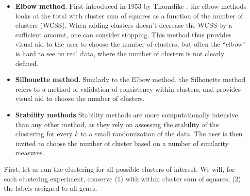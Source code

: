 \documentclass[9pt,a4paper,]{extarticle}
\newenvironment{Shaded}{\begin{snugshade}}{\end{snugshade}}
\newcommand{\ControlFlowTok}[1]{\textcolor[rgb]{0.13,0.29,0.53}{\textbf{#1}}}
\newcommand{\DataTypeTok}[1]{\textcolor[rgb]{0.13,0.29,0.53}{#1}}
\newcommand{\DecValTok}[1]{\textcolor[rgb]{0.00,0.00,0.81}{#1}}
\newcommand{\KeywordTok}[1]{\textcolor[rgb]{0.13,0.29,0.53}{\textbf{#1}}}
\newcommand{\NormalTok}[1]{#1}
\newcommand{\OperatorTok}[1]{\textcolor[rgb]{0.81,0.36,0.00}{\textbf{#1}}}
\newcommand{\StringTok}[1]{\textcolor[rgb]{0.31,0.60,0.02}{#1}}
\begin{document}
\begin{itemize}
\tightlist
\item
  \textbf{Elbow method}. First introduced in 1953 by Thorndike \citep{thorndike:who},
  the elbow methods looks at the total with cluster sum of squares
  as a function of the number of clusters (WCSS). When adding clusters
  doesn't decrease the WCSS by a sufficient
  amount, one can consider stopping. This method thus provides visual aid to
  the user to choose the number of clusters, but often the ``elbow'' is hard to
  see on real data, where the number of clusters is not clearly defined.
\item
  \textbf{Silhouette method}. Similarly to the Elbow method, the Silhouette method
  refers to a method of validation of consistency within clusters, and
  provides visual aid to choose the number of clusters.
\item
  \textbf{Stability methods} Stability methods are more computationally intensive
  than any other method, as they rely on assessing the stability of the
  clustering for every \(k\) to a small randomization of the data. The user is
  then invited to choose the number of cluster based on a number of similarity
  measures.
\end{itemize}

First, let us run the clustering for all possible clusters of interest. We
will, for each clustering experiment, conserve (1) with within cluster sum of
squares; (2) the labels assigned to all genes.

\begin{Shaded}
\end{Shaded}
\end{document}
